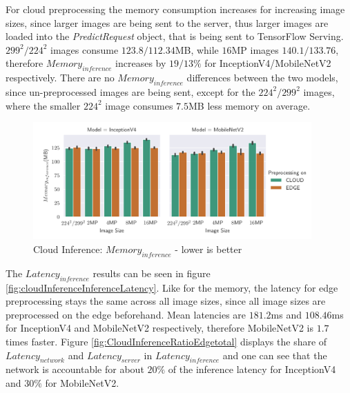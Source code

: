 For cloud preprocessing the memory consumption increases for increasing image sizes, since larger images are being sent to the server, thus larger images are loaded into the \emph{PredictRequest} object, that is being sent to TensorFlow Serving.
$299^2/224^2$ images consume $123.8/112.34$MB, while $16$MP images $140.1/133.76$, therefore $Memory_{inference}$ increases by $19/13\%$ for InceptionV4/MobileNetV2 respectively.
There are no $Memory_{inference}$  differences between the two models, since un-preprocessed images are being sent, except for the $224^2/299^2$ images, where the smaller $224^2$ image consumes $7.5$MB less memory on average.
\begin{figure}[!htb]
\centering
\includegraphics[width=0.95\textwidth]{./Bilder/single_plots/cloud_inference_plots/Cloud_Inference_Memory.pdf}
\caption{Cloud Inference:  $Memory_{inference}$ - lower is better}
\label{fig:cloudInferenceInferenceMemory}
\end{figure}
The $Latency_{inference}$ results can be seen in figure \ref{fig:cloudInferenceInferenceLatency}.
Like for the memory, the latency for edge preprocessing stays the same across all image sizes, since all image sizes are preprocessed on the edge beforehand. 
Mean latencies are $181.2$ms and $108.46$ms for InceptionV4 and MobileNetV2 respectively, therefore MobileNetV2 is $1.7$ times faster.
Figure \ref{fig:CloudInferenceRatioEdgetotal} displays the share of $Latency_{network}$ and $Latency_{server}$ in $Latency_{inference}$ and one can see that the network is accountable for about $20\%$ of the  inference latency for InceptionV4 and $30\%$ for MobileNetV2.

